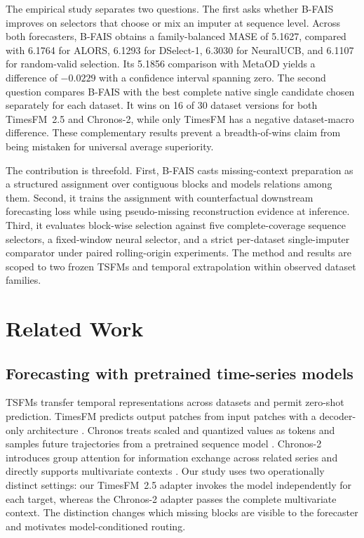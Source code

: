 \documentclass{article}
\newcommand{\bfais}{\textsc{B-FAIS}\xspace}
\begin{document}
The empirical study separates two questions. The first asks whether \bfais improves on selectors that choose or mix an imputer at sequence level. Across both forecasters, \bfais obtains a family-balanced MASE of 5.1627, compared with 6.1764 for ALORS, 6.1293 for DSelect-1, 6.3030 for NeuralUCB, and 6.1107 for random-valid selection. Its 5.1856 comparison with MetaOD yields a difference of $-0.0229$ with a confidence interval spanning zero. The second question compares \bfais with the best complete native single candidate chosen separately for each dataset. It wins on 16 of 30 dataset versions for both TimesFM~2.5 \citep{google2025timesfm25} and Chronos-2, while only TimesFM has a negative dataset-macro difference. These complementary results prevent a breadth-of-wins claim from being mistaken for universal average superiority.

The contribution is threefold. First, \bfais casts missing-context preparation as a structured assignment over contiguous blocks and models relations among them. Second, it trains the assignment with counterfactual downstream forecasting loss while using pseudo-missing reconstruction evidence at inference. Third, it evaluates block-wise selection against five complete-coverage sequence selectors, a fixed-window neural selector, and a strict per-dataset single-imputer comparator under paired rolling-origin experiments. The method and results are scoped to two frozen TSFMs and temporal extrapolation within observed dataset families.

\section{Related Work}
\label{sec:related}

\subsection{Forecasting with pretrained time-series models}

TSFMs transfer temporal representations across datasets and permit zero-shot prediction. TimesFM predicts output patches from input patches with a decoder-only architecture \citep{das2024timesfm}. Chronos treats scaled and quantized values as tokens and samples future trajectories from a pretrained sequence model \citep{ansari2024chronos}. Chronos-2 introduces group attention for information exchange across related series and directly supports multivariate contexts \citep{ansari2025chronos2}. Our study uses two operationally distinct settings: our TimesFM~2.5 adapter invokes the model independently for each target, whereas the Chronos-2 adapter passes the complete multivariate context. The distinction changes which missing blocks are visible to the forecaster and motivates model-conditioned routing.
\end{document}
